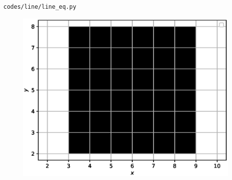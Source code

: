 \begin{enumerate}[label=\arabic*.,ref=\thesubsubsection.\theenumi]
\begin{lstlisting}
codes/line/line_eq.py
\end{lstlisting}
%
\begin{figure}[!ht]
\includegraphics[width=\columnwidth]{./figs/line/line_eq.eps}
\caption{}
\label{fig:line_ineq}
\end{figure}
%



\end{enumerate}
